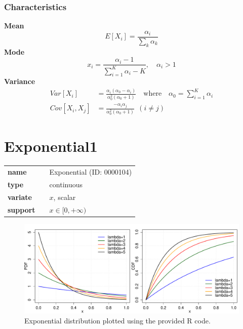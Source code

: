 \subsubsection*{Characteristics}
\smallskip \noindent \hspace{.2cm} \textbf{Mean} 
\begin{equation*}E[X_i] = \frac{\alpha_i}{\sum_k \alpha_k}\end{equation*}
\smallskip \noindent \hspace{.2cm} \textbf{Mode} 
\begin{equation*}x_i = \frac{\alpha_i - 1}{\sum_{i=1}^K\alpha_i - K}, \quad \alpha_i > 1\end{equation*}
\smallskip \noindent \hspace{.2cm} \textbf{Variance} 
\begin{align*}Var[X_i] &= \frac{\alpha_i (\alpha_0-\alpha_i)}{\alpha_0^2 (\alpha_0+1)} \quad \text{where} \quad \alpha_0 = \sum_{i=1}^K\alpha_i \\ Cov[X_i,X_j] & = \frac{- \alpha_i \alpha_j}{\alpha_0^2 (\alpha_0+1)}~~(i\neq j)\end{align*}
\smallskip
\section*{Exponential1} 

  \bigskip 

\begin{tabular}{p{2cm}cl}
\textbf{name} & & Exponential (ID: 0000104)\\ 
 
\textbf{type} & & continuous \\ 

\textbf{variate} & & $x$, scalar \\ 

\textbf{support} & & $x \in [0,+\infty)$
\end{tabular}

\begin{figure}[ht!]
\centering
  \includegraphics[width=140mm]{pics/Exponential.pdf}
 \caption{Exponential distribution plotted using the provided R code.}
 \label{fig:Exponential}
\end{figure}

